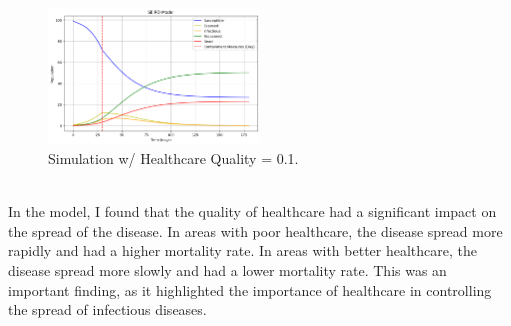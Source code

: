 \documentclass[%
 reprint,
superscriptaddress,
 amsmath,amssymb,
 aps,
]{revtex4-2}
\begin{document}
{\begin{figure}[hbt!]
    \includegraphics[width=0.5\textwidth]{HealthcareC.png}
    \caption{Simulation w/ Healthcare Quality = 0.1.}
    \label{HealthcareC}
\end{figure} \\
In the model, I found that the quality of healthcare had a significant impact on the spread of the disease. In areas with poor healthcare, the disease spread more rapidly and had a higher mortality rate. In areas with better healthcare, the disease spread more slowly and had a lower mortality rate. This was an important finding, as it highlighted the importance of healthcare in controlling the spread of infectious diseases. }
\end{document}
